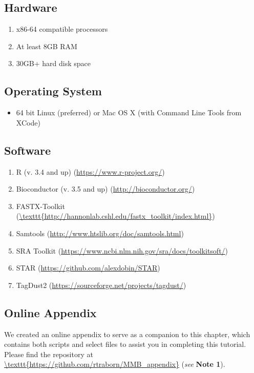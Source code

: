 \documentclass[runningheads,a4paper]{llncs}
\begin{document}
\begin{linenumbers}
\subsection{Hardware}
\begin{enumerate} 
\item x86-64 compatible processors
\item At least 8GB RAM
\item 30GB+ hard disk space
\end{enumerate}

\subsection{Operating System}
\begin{itemize}
\item 64 bit Linux (preferred) or Mac OS X (with Command Line Tools from XCode)
\end{itemize}

\subsection{Software}
\begin{enumerate}
\item R (v. 3.4 and up) \cite{RCore:2017ab} (\url{https://www.r-project.org/})
\item Bioconductor (v. 3.5 and up) \cite{Lawrence:2014gy} (\url{http://bioconductor.org/})
\item FASTX-Toolkit \cite{citeulike:9103573} (\url{\texttt{http://hannonlab.cshl.edu/fastx\_toolkit/index.html}})
\item Samtools \cite{Li:2009ka} (\url{http://www.htslib.org/doc/samtools.html})
\item SRA Toolkit \cite{Leinonen:2011iw}  (\url{https://www.ncbi.nlm.nih.gov/sra/docs/toolkitsoft/})
\item STAR \cite{Dobin:2016kq} (\url{https://github.com/alexdobin/STAR})
\item TagDust2 \cite{Lassmann:2015gs} (\url{https://sourceforge.net/projects/tagdust/})
\end{enumerate}

\subsection{Online Appendix}
We created an online appendix to serve as a companion to this chapter, which contains both scripts and select files to assist you in completing this tutorial.
Please find the repository at \url{\texttt{https://github.com/rtraborn/MMB\_appendix}} (\textit{see} \textbf{Note 1}).


\end{linenumbers}
\end{document}
